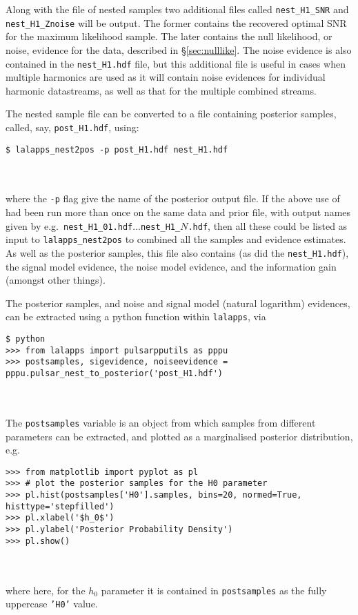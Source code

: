 Along with the file of nested samples two additional files called {\tt nest\_H1\_SNR} and {\tt nest\_H1\_Znoise} will be output. The former contains the
recovered optimal SNR for the maximum likelihood sample. The later contains the null likelihood, or noise, evidence for the data, described in
\S\ref{sec:nulllike}. The noise evidence is also contained in the {\tt nest\_H1.hdf} file, but this additional file is useful in cases when multiple
harmonics are used as it will contain noise evidences for individual harmonic datastreams, as well as that for the multiple combined streams.

The nested sample file can be converted to a file containing posterior samples, called, say, {\tt post\_H1.hdf}, using:
\begin{lrbox}{\Lst}
\begin{lstlisting}
$ lalapps_nest2pos -p post_H1.hdf nest_H1.hdf
\end{lstlisting}
\end{lrbox}
\\[5pt] \indent \fbox{\usebox{\Lst}} \\[5pt]
where the {\tt -p} flag give the name of the posterior output file. If the above use of \lppen had been run more than once on the same data and prior file,
with output names given by e.g.\ {\tt nest\_H1\_01.hdf}...{\tt nest\_H1\_$N$.hdf}, then all these could be listed as input to {\tt lalapps\_nest2pos} to
combined all the samples and evidence estimates. As well as the posterior samples, this file also contains (as did the {\tt nest\_H1.hdf}),
the signal model evidence, the noise model evidence, and the information gain (amongst other things).

The posterior samples, and noise and signal model (natural logarithm) evidences, can be extracted using a python function within {\tt lalapps}, via
\begin{lrbox}{\Lst}
\begin{lstlisting}
$ python
>>> from lalapps import pulsarpputils as pppu
>>> postsamples, sigevidence, noiseevidence = pppu.pulsar_nest_to_posterior('post_H1.hdf')
\end{lstlisting}
\end{lrbox}
\\[5pt] \indent \fbox{\usebox{\Lst}} \\[5pt]
The {\tt postsamples} variable is an object from which samples from different parameters can be extracted, and plotted as a marginalised posterior
distribution, e.g.\
\begin{lrbox}{\Lst}
\begin{lstlisting}
>>> from matplotlib import pyplot as pl
>>> # plot the posterior samples for the H0 parameter
>>> pl.hist(postsamples['H0'].samples, bins=20, normed=True, histtype='stepfilled')
>>> pl.xlabel('$h_0$')
>>> pl.ylabel('Posterior Probability Density')
>>> pl.show()
\end{lstlisting}
\end{lrbox}
\\[5pt] \indent \fbox{\usebox{\Lst}} \\[5pt]
where here, for the $h_0$ parameter it is contained in {\tt postsamples} as the fully uppercase {\tt 'H0'} value. 

